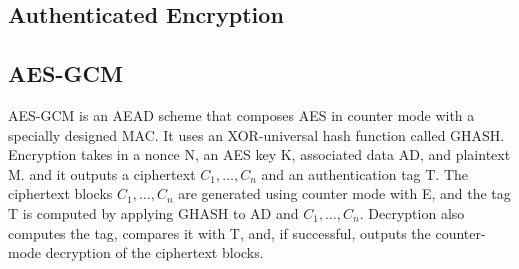 \subsection*{Authenticated Encryption}\label{subsec:authenticated-encryption}

\subsection*{AES-GCM}\label{subsec:aes-gcm}
AES-GCM is an AEAD scheme that composes AES in counter mode with a specially designed MAC.
It uses an XOR-universal hash function called GHASH.
Encryption takes in a nonce N, an AES key K, associated data AD, and plaintext M.
and it outputs a ciphertext $C_{1},\ldots,C_{n}$ and an authentication tag T.
The ciphertext blocks $C_{1},\ldots,C_{n}$ are generated using counter mode with E, and the tag T
is computed by applying GHASH to AD and $C_{1},\ldots,C_{n}$.
Decryption also computes the tag, compares it with T, and, if successful, outputs the counter-mode decryption of the ciphertext
blocks.